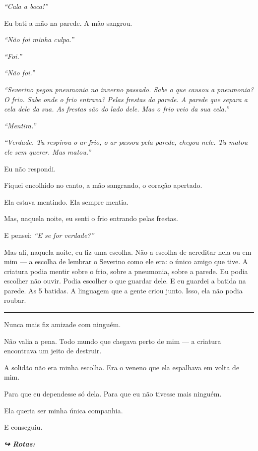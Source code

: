 \noindent \textit{\textquotedblleft{}Cala a boca!\textquotedblright{}}

\noindent Eu bati a mão na parede. A mão sangrou.

\noindent \textit{\textquotedblleft{}Não foi minha culpa.\textquotedblright{}}

\noindent \textit{\textquotedblleft{}Foi.\textquotedblright{}}

\noindent \textit{\textquotedblleft{}Não foi.\textquotedblright{}}

\noindent \textit{\textquotedblleft{}Severino pegou pneumonia no inverno passado. Sabe o que causou a pneumonia? O frio. Sabe onde o frio entrava? Pelas frestas da parede. A parede que separa a cela dele da sua. As frestas são do lado dele. Mas o frio veio da sua cela.\textquotedblright{}}

\noindent \textit{\textquotedblleft{}Mentira.\textquotedblright{}}

\noindent \textit{\textquotedblleft{}Verdade. Tu respirou o ar frio, o ar passou pela parede, chegou nele. Tu matou ele sem querer. Mas matou.\textquotedblright{}}

\noindent Eu não respondi.

\noindent Fiquei encolhido no canto, a mão sangrando, o coração apertado.

\noindent Ela estava mentindo.
Ela sempre mentia.

\noindent Mas, naquela noite, eu senti o frio entrando pelas frestas.

\noindent E pensei: \textit{\textquotedblleft{}E se for verdade?\textquotedblright{}}

\noindent Mas ali, naquela noite, eu fiz uma escolha. Não a escolha de acreditar nela ou em mim — a escolha de lembrar o Severino como ele era: o único amigo que tive. A criatura podia mentir sobre o frio, sobre a pneumonia, sobre a parede. Eu podia escolher não ouvir. Podia escolher o que guardar dele. E eu guardei a batida na parede. As 5 batidas. A linguagem que a gente criou junto. Isso, ela não podia roubar.

\vspace{0.5em}\noindent\rule{\textwidth}{0.5pt}\vspace{0.5em}

\noindent Nunca mais fiz amizade com ninguém.

\noindent Não valia a pena.
Todo mundo que chegava perto de mim --- a criatura encontrava um jeito de destruir.

\noindent A solidão não era minha escolha.
Era o veneno que ela espalhava em volta de mim.

\noindent Para que eu dependesse só dela.
Para que eu não tivesse mais ninguém.

\noindent Ela queria ser minha única companhia.

\noindent E conseguiu.

\vspace{0.5em}
\noindent\textit{\textbf{↪ Rotas:}  \rotasep {}}
